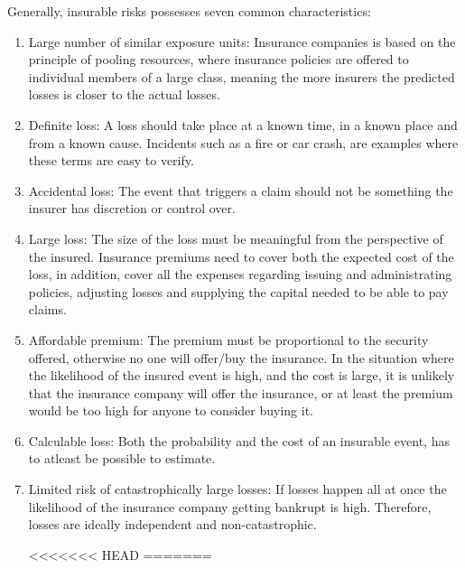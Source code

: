  Generally, insurable risks possesses seven common characteristics: \cite{mehr1980principles}
   \begin{enumerate}
   \item Large number of similar exposure units: Insurance companies is based on the principle of pooling resources, where insurance policies are offered to individual members of a large class, meaning the more insurers the predicted losses is closer to the actual losses. 
   \item Definite loss: A loss should take place at a known time, in a known place and from a known cause. Incidents such as a fire or car crash, are examples where these terms are easy to verify.
   \item Accidental loss: The event that triggers a claim should not be something the insurer has discretion or control over.
   \item Large loss: The size of the loss must be meaningful from the perspective of the insured. Insurance premiums need to cover both the expected cost of the loss, in addition, cover all the expenses regarding issuing and administrating policies, adjusting losses and supplying the capital needed to be able to pay claims.
   \item Affordable premium: The premium must be proportional to the security offered, otherwise no one will offer/buy the insurance. In the situation where the likelihood of the insured event is high, and the cost is large, it is unlikely that the insurance company will offer the insurance, or at least the premium would be too high for anyone to consider buying it. 
   \item Calculable loss: Both the probability and the cost of an insurable event, has to atleast be possible to estimate. 
   \item Limited risk of catastrophically large losses: If losses happen all at once the likelihood of the insurance company getting bankrupt is high. Therefore, losses are ideally independent and non-catastrophic. 
   
<<<<<<< HEAD
=======
   \end{enumerate}
    
